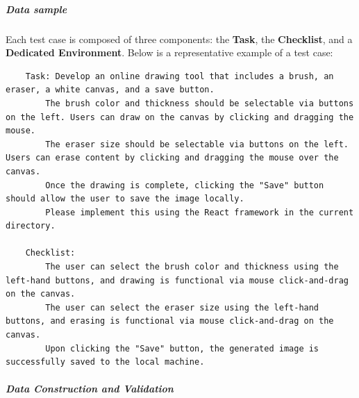 \documentclass{article}
\theoremstyle{definition}
\begin{document}
\subparagraph{Data sample}
Each test case is composed of three components: the \textbf{Task}, the \textbf{Checklist}, and a \textbf{Dedicated Environment}. Below is a representative example of a test case:
\begin{tcolorbox}[left=0mm,right=0mm,top=0mm,bottom=0mm,boxsep=1mm,arc=0mm,boxrule=0pt, frame empty, breakable]
\footnotesize
\begin{lstlisting}
    Task: Develop an online drawing tool that includes a brush, an eraser, a white canvas, and a save button.
        The brush color and thickness should be selectable via buttons on the left. Users can draw on the canvas by clicking and dragging the mouse.
        The eraser size should be selectable via buttons on the left. Users can erase content by clicking and dragging the mouse over the canvas.
        Once the drawing is complete, clicking the "Save" button should allow the user to save the image locally.
        Please implement this using the React framework in the current directory.

    Checklist:
        The user can select the brush color and thickness using the left-hand buttons, and drawing is functional via mouse click-and-drag on the canvas.
        The user can select the eraser size using the left-hand buttons, and erasing is functional via mouse click-and-drag on the canvas.
        Upon clicking the "Save" button, the generated image is successfully saved to the local machine.
\end{lstlisting}
\end{tcolorbox}
\noindent\begin{minipage}{\textwidth}
\end{minipage}

\subparagraph{\textbf{Data Construction and Validation}}
\end{document}
